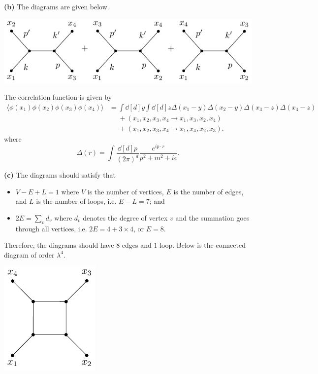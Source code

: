 \documentclass{article}
\makeatletter
\newcommand*{\shifttext}[1]{%
  \settowidth{\@tempdima}{#1}%
  \hspace{-\@tempdima}#1%
}
\newcommand{\plabel}[1]{%
\shifttext{\textbf{#1}\quad}%
}
\makeatother
\begin{document}
\plabel{(b)}%
The diagrams are given below.
\begin{center}
    \includegraphics{img/second-order/second-order-2.pdf}
\end{center}
The correlation function is given by
\begin{align*}
    \langle \phi(x_1) \phi(x_2) \phi(x_3) \phi(x_4) \rangle &= \int \dd[d]{y} \int \dd[d]{z} \Delta(x_1 - y)\Delta(x_2 - y)\Delta(x_3 - z)\Delta(x_4 - z) \\
    &\phantom{{}={}} + (x_1,x_2,x_3,x_4 \rightarrow x_1,x_3,x_2,x_4) \\
    &\phantom{{}={}} + (x_1,x_2,x_3,x_4 \rightarrow x_1,x_4,x_2,x_3).
\end{align*}
where
\[ \Delta(r) = \int \frac{\dd[d]{p}}{(2\pi)^d} \frac{e^{ip\cdot r}}{p^2 + m^2 + i\epsilon}. \]

\plabel{(c)}%
The diagrams should satisfy that
\begin{itemize}
    \item $V - E + L = 1$ where $V$ is the number of vertices, $E$ is the number of edges, and $L$ is the number of loops, i.e. $E - L = 7$; and
    \item $2E = \sum_{v} d_v$ where $d_v$ denotes the degree of vertex $v$ and the summation goes through all vertices, i.e. $2E = 4 + 3\times 4$, or $E=8$.
\end{itemize}
Therefore, the diagrams should have $8$ edges and $1$ loop.
Below is the connected diagram of order $\lambda^4$.
\begin{center}
    \includegraphics{img/fourth-order/fourth-order.pdf}
\end{center}
\end{document}
